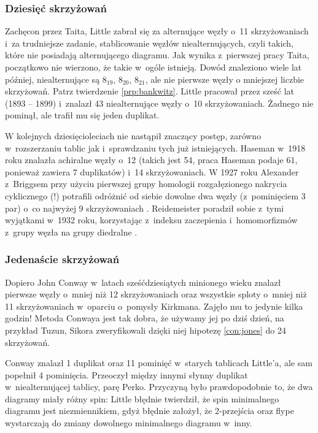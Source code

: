 \subsubsection{Dziesięć skrzyżowań}
Zachęcon przez Taita, Little zabrał się za alternujące węzły o~11 skrzyżowaniach i~za trudniejsze zadanie, stablicowanie węzłów niealternujących, czyli takich, które nie posiadają alternującego diagramu.
Jak wynika z~pierwszej pracy Taita, początkowo nie wierzono, że takie w~ogóle istnieją.
Dowód znaleziono wiele lat później, niealternujące są $8_{19}$, $8_{20}$, $8_{21}$, ale nie pierwsze węzły o mniejszej liczbie skrzyżowań.
Patrz twierdzenie \ref{prp:bankwitz}.
Little pracował przez sześć lat (1893 -- 1899) i~znalazł 43 niealternujące węzły o~10 skrzyżowaniach.
Żadnego nie pominął, ale trafił mu się jeden duplikat.

W kolejnych dziesięcioleciach nie nastąpił znaczący postęp, zarówno w~rozszerzaniu tablic jak i~sprawdzaniu tych już istniejących.
Haseman \cite{haseman18} w~1918 roku znalazła achiralne węzły o~12 (takich jest 54, praca Haseman podaje 61, ponieważ zawiera 7 duplikatów) i~14 skrzyżowaniach.
W 1927 roku Alexander z~Briggsem przy użyciu pierwszej grupy homologii rozgałęzionego nakrycia cyklicznego (!) potrafili odróżnić od siebie dowolne dwa węzły (z~pominięciem 3 par) o~co najwyżej 9 skrzyżowaniach \cite{briggs27}.
Reidemeister poradził sobie z~tymi wyjątkami w~1932 roku, korzystając z~indeksu zaczepienia i~homomorfizmów z~grupy węzła na grupy diedralne \cite{reidemeister32}.

\subsubsection{Jedenaście skrzyżowań}
Dopiero John Conway w~latach sześćdziesiątych minionego wieku znalazł pierwsze węzły o~mniej niż 12 skrzyżowaniach oraz wszystkie sploty o~mniej niż 11 skrzyżowaniach w~oparciu o~pomysły Kirkmana.
Zajęło mu to jedynie kilka godzin!
Metoda Conwaya jest tak dobra, że używamy jej po dziś dzień, na przykład Tuzun, Sikora zweryfikowali dzięki niej hipotezę \ref{con:jones} do 24 skrzyżowań.

Conway znalazł 1 duplikat oraz 11 pominięć w~starych tablicach Little'a, ale sam popełnił 4 pominięcia.
Przeoczył między innymi słynny duplikat w~niealternującej tablicy, parę Perko.
%
%
Przyczyną było prawdopodobnie to, że dwa diagramy miały różny spin:
Little błędnie twierdził, że spin minimalnego diagramu jest niezmiennikiem, gdyż błędnie założył, że 2-przejścia oraz flype wystarczają do zmiany dowolnego minimalnego diagramu w~inny.


